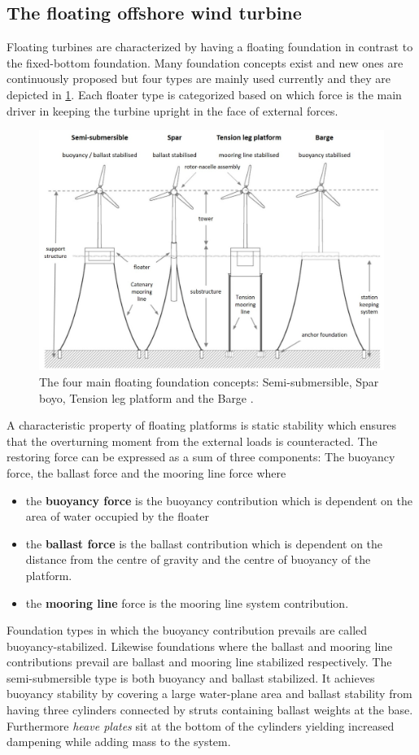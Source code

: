 \subsection{The floating offshore wind turbine} \label{sec:intro_theFOWT}
Floating turbines are characterized by having a floating foundation in contrast to the fixed-bottom foundation. Many foundation concepts exist and new ones are continuously proposed but four types are mainly used currently and they are depicted in \cref{fig:floating_concepts}. Each floater type is categorized based on which force is the main driver in keeping the turbine upright in the face of external forces.
\begin{figure}[ht]
	\centering
	\includegraphics[width=0.82\linewidth]{Graphics/FloatingFoundationConcepts.jpg}
	\caption{The four main floating foundation concepts: Semi-submersible, Spar boyo, Tension leg platform and the Barge \cite{DNV-GL2018}.}
	\label{fig:floating_concepts}
\end{figure}
A characteristic property of floating platforms is static stability which ensures that the overturning moment from the external loads is counteracted. The restoring force can be expressed as a sum of three components: The buoyancy force, the ballast force and the mooring line force where
\begin{itemize}
	\item the \textbf{buoyancy force} is the buoyancy contribution which is dependent on the area of water occupied by the floater
	\item the \textbf{ballast force} is the ballast contribution which is dependent on the distance from the centre of gravity and the centre of buoyancy of the platform.
	\item the \textbf{mooring line} force is the mooring line system contribution.
\end{itemize}
Foundation types in which the buoyancy contribution prevails are called buoyancy-stabilized. Likewise foundations where the ballast and mooring line contributions prevail are ballast and mooring line stabilized respectively. The semi-submersible type is both buoyancy and ballast stabilized. It achieves buoyancy stability by covering a large water-plane area and ballast stability from having three cylinders connected by struts containing ballast weights at the base. Furthermore \textit{heave plates} sit at the bottom of the cylinders yielding increased dampening while adding mass to the system.

